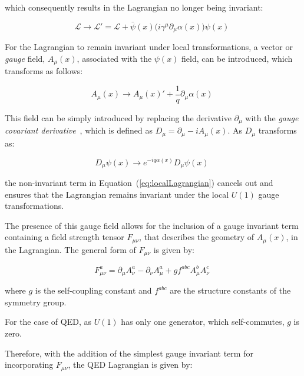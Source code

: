 which consequently results in the Lagrangian no longer being invariant:

\begin{equation}
\mathcal{L} \rightarrow \mathcal{L}' = \mathcal{L} + \bar{\psi}(x) \big( i {\gamma}^{\mu} \partial_{\mu} \alpha(x) \big) \psi(x) \;
\label{eq:localLagrangian}
\end{equation}

For the Lagrangian to remain invariant under local transformations, a vector or \emph{gauge} field, $A_{\mu}(x)$, associated with the $\psi(x)$ field, can be introduced, which transforms as follows:

\begin{equation}
A_{\mu}(x) \rightarrow A_{\mu}(x)' + \frac{1}{q} \partial_{\mu} \alpha(x) \;
\label{eq:vectorField}
\end{equation}

This field can be simply introduced by replacing the derivative $\partial_{\mu}$ with the \emph{gauge covariant derivative}~\cite{QFT}, which is defined as $D_{\mu} = \partial_{\mu} - i A_{\mu}(x)$.
As $D_{\mu}$ transforms as:

\begin{equation}
D_{\mu}\psi(x) \rightarrow e^{-i q \alpha (x) } D_{\mu} \psi(x) \;
\label{eq:Dtransform}
\end{equation}

the non-invariant term in Equation~(\ref{eq:localLagrangian}) cancels out and ensures that the Lagrangian remains invariant under the local $U(1)$ gauge transformations.

The presence of this gauge field allows for the inclusion of a gauge invariant term containing a field strength tensor $F_{\mu \nu}$, that describes the geometry of $A_{\mu}(x)$, in the Lagrangian.
The general form of $F_{\mu \nu}$ is given by:

\begin{equation}
F^{a}_{\mu \nu} = \partial_{\mu} A^{a}_{\nu} - \partial_{\nu} A^{a}_{\mu} + g f^{abc} A^{b}_{\mu} A^{c}_{\nu} \;
\label{eq:fieldStrengthTensor}
\end{equation}

where $g$ is the self-coupling constant and $f^{abc}$ are the structure constants of the symmetry group.

For the case of QED, as $U(1)$ has only one generator, which self-commutes, $g$ is zero.

Therefore, with the addition of the simplest gauge invariant term for incorporating $F_{\mu \nu}$, the QED Lagrangian is given by:

